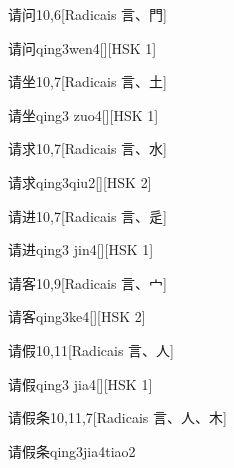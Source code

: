 \begin{entry}{请问}{10,6}[Radicais ⾔、⾨]
  \begin{phonetics}{请问}{qing3wen4}[][HSK 1]
  \end{phonetics}
\end{entry}

\begin{entry}{请坐}{10,7}[Radicais ⾔、⼟]
  \begin{phonetics}{请坐}{qing3 zuo4}[][HSK 1]
  \end{phonetics}
\end{entry}

\begin{entry}{请求}{10,7}[Radicais ⾔、⽔]
  \begin{phonetics}{请求}{qing3qiu2}[][HSK 2]
  \end{phonetics}
\end{entry}

\begin{entry}{请进}{10,7}[Radicais ⾔、⾡]
  \begin{phonetics}{请进}{qing3 jin4}[][HSK 1]
  \end{phonetics}
\end{entry}

\begin{entry}{请客}{10,9}[Radicais ⾔、⼧]
  \begin{phonetics}{请客}{qing3ke4}[][HSK 2]
  \end{phonetics}
\end{entry}

\begin{entry}{请假}{10,11}[Radicais ⾔、⼈]
  \begin{phonetics}{请假}{qing3 jia4}[][HSK 1]
  \end{phonetics}
\end{entry}

\begin{entry}{请假条}{10,11,7}[Radicais ⾔、⼈、⽊]
  \begin{phonetics}{请假条}{qing3jia4tiao2}
  \end{phonetics}
\end{entry}

